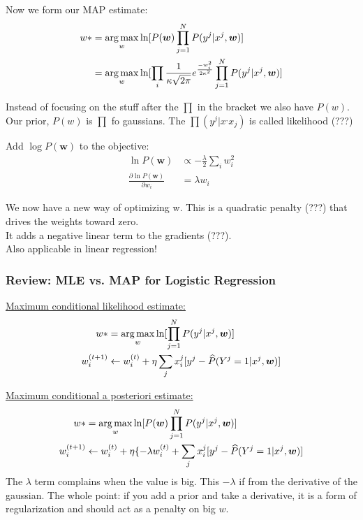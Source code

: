 Now we form our MAP estimate: 
\begin{align*}
	w* &= \operatorname*{arg\,max}_w \ln[P(\bm{w}) \prod_{j=1}^N P(y^j | x^j, \bm{w})]  \\
		&= \operatorname*{arg\,max}_w \ln[ \prod_i \frac{1}{\kappa \sqrt{2 \pi}} e^{\frac{-w_i^2}{2 \kappa^2}}   \prod_{j=1}^N P(y^j | x^j, \bm{w})]
\end{align*}

 Instead of focusing on the stuff after the $\prod$ in the bracket we also have $P(w)$.
 Our prior, $P(w)$ is $\prod$ fo gaussians.
 The $\prod(y^j|x^, x_j)$ is called likelihood (???)  

Add $\log P(\bm{w})$ to the objective:
\begin{align*}
	\ln P(\bm{w}) & \propto - \frac{\lambda}{2} \sum_i w_i^2 \\
	\frac{\partial \ln P(\bm{w})}{\partial w_i} &= \lambda w_i
\end{align*}

We now have a new way of optimizing w.
This is a quadratic penalty (???) that drives the weights toward zero. \hfill \\
It adds a negative linear term to the gradients (???).  \hfill \\
Also applicable in linear regression! 

\subsubsection{Review: MLE vs. MAP for Logistic Regression}
\underline{Maximum conditional likelihood estimate:}
\begin{align*}
	w* &= \operatorname*{arg\,max}_w \ln[\prod_{j=1}^N P(y^j | x^j, \bm{w})] \\
	w_i^{(t+1)} & \leftarrow w_i^{(t)} + \eta \sum_j x_i^j [y^j - \widehat{P}(Y^j = 1 | x^j, \bm{w})]\\
\end{align*}

\underline{Maximum conditional a posteriori estimate:}
\begin{align*}
	w* &= \operatorname*{arg\,max}_w \ln[P(\bm{w}) \prod_{j=1}^N P(y^j | x^j, \bm{w})] \\
	w_i^{(t+1)} & \leftarrow w_i^{(t)} + \eta \{ -\lambda w_i^{(t)} +  \sum_j x_i^j [y^j - \widehat{P}(Y^j = 1 | x^j, \bm{w})]\\
\end{align*}
The $\lambda$ term complains when the value is big.
This $-\lambda$ if from the derivative of the gaussian.
The whole point: if you add a prior and take a derivative, it is a form of regularization and should act as a penalty on big $w$. 


